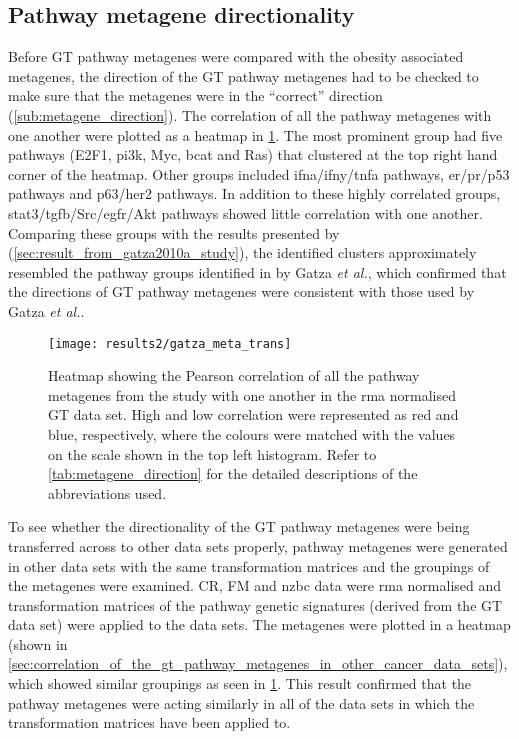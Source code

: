 \subsection{Pathway metagene directionality}
\label{sub:pathway_metagene_directionality}

Before GT pathway metagenes were compared with the obesity associated metagenes, the direction of the GT pathway metagenes had to be checked to make sure that the metagenes were in the ``correct'' direction (\cref{sub:metagene_direction}).
The correlation of all the pathway metagenes with one another were plotted as a heatmap in \cref{fig:gatza_meta_dir}.
The most prominent group had five pathways (E2F1, \gls{pi3k}, Myc, \gls{bcat} and Ras) that clustered at the top right hand corner of the heatmap.
Other groups included \gls{ifna}/\gls{ifny}/\gls{tnfa} pathways, \gls{er}/\gls{pr}/p53 pathways and p63/\gls{her2} pathways.
In addition to these highly correlated groups, \gls{stat3}/\gls{tgfb}/Src/\gls{egfr}/Akt pathways showed little correlation with one another.
Comparing these groups with the results presented by \citet{Gatza2010a} (\cref{sec:result_from_gatza2010a_study}), the identified clusters approximately resembled the pathway groups identified in by Gatza \textit{et al.}, which confirmed that the directions of GT pathway metagenes were consistent with those used by Gatza \textit{et al.}.

\begin{figure}[htb]
	\centering
	\texttt{[image: results2/gatza\_meta\_trans]}
	\caption[Heatmap of the Pearson correlation of all the pathway metagenes with one another in the \acrshort{rma} normalised GT data]{Heatmap showing the Pearson correlation of all the pathway metagenes from the \citet{Gatza2010a} study with one another  in the \gls{rma} normalised GT data set.
		High and low correlation were represented as red and blue, respectively, where the colours were matched with the values on the scale shown in the top left histogram.
		Refer to \cref{tab:metagene_direction} for the detailed descriptions of the abbreviations used.
		}
	\label{fig:gatza_meta_dir}
\end{figure}

To see whether the directionality of the GT pathway metagenes were being transferred across to other data sets properly, pathway metagenes were generated in other data sets with the same transformation matrices and the groupings of the metagenes were examined.
CR, FM and \gls{nzbc} data were \gls{rma} normalised and transformation matrices of the pathway genetic signatures (derived from the GT data set) were applied to the data sets.
The metagenes were plotted in a heatmap (shown in \cref{sec:correlation_of_the_gt_pathway_metagenes_in_other_cancer_data_sets}), which showed similar groupings  as seen in \cref{fig:gatza_meta_dir}.
This result confirmed that the pathway metagenes were acting similarly in all of the data sets in which the transformation matrices have been applied to.

